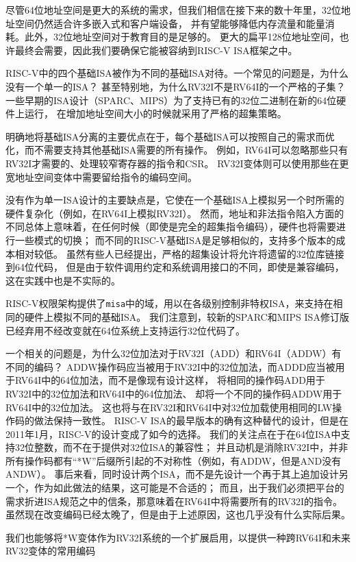 \begin{commentary}

尽管64位地址空间是更大的系统的需求，但我们相信在接下来的数十年里，32位地址空间仍然适合许多嵌入式和客户端设备，
并有望能够降低内存流量和能量消耗。此外，32位地址空间对于教育目的是足够的。
更大的扁平128位地址空间，也许最终会需要，因此我们要确保它能被容纳到RISC-V ISA框架之中。
\end{commentary}

\begin{commentary}

RISC-V中的四个基础ISA被作为不同的基础ISA对待。一个常见的问题是，为什么没有一个单一的ISA？
甚至特别地，为什么RV32I不是RV64I的一个严格的子集？
一些早期的ISA设计（SPARC、MIPS）为了支持已有的32位二进制在新的64位硬件上运行，
在增加地址空间大小的时候就采用了严格的超集策略。

明确地将基础ISA分离的主要优点在于，每个基础ISA可以按照自己的需求而优化，而不需要支持其他基础ISA需要的所有操作。
例如，RV64I可以忽略那些只有RV32I才需要的、处理较窄寄存器的指令和CSR。
RV32I变体则可以使用那些在更宽地址空间变体中需要留给指令的编码空间。

没有作为单一ISA设计的主要缺点是，它使在一个基础ISA上模拟另一个时所需的硬件复杂化（例如，在RV64I上模拟RV32I）。
然而，地址和非法指令陷入方面的不同总体上意味着，在任何时候（即使是完全的超集指令编码），硬件也将需要进行一些模式的切换；
而不同的RISC-V基础ISA是足够相似的，支持多个版本的成本相对较低。
虽然有些人已经提出，严格的超集设计将允许将遗留的32位库链接到64位代码，
但是由于软件调用约定和系统调用接口的不同，即使是兼容编码，这在实践中也是不实际的。

RISC-V权限架构提供了{\tt misa}中的域，用以在各级别控制非特权ISA，来支持在相同的硬件上模拟不同的基础ISA。
我们注意到，较新的SPARC和MIPS ISA修订版已经弃用不经改变就在64位系统上支持运行32位代码了。

一个相关的问题是，为什么32位加法对于RV32I（ADD）和RV64I（ADDW）有不同的编码？
ADDW操作码应当被用于RV32I中的32位加法，而ADDD应当被用于RV64I中的64位加法，而不是像现有设计这样，
将相同的操作码ADD用于RV32I中的32位加法和RV64I中的64位加法、
却将一个不同的操作码ADDW用于RV64I中的32位加法。
这也将与在RV32I和RV64I中对32位加载使用相同的LW操作码的做法保持一致性。
RISC-V ISA的最早版本的确有这种替代的设计，但是在2011年1月，RISC-V的设计变成了如今的选择。
我们的关注点在于在64位ISA中支持32位整数，而不在于提供对32位ISA的兼容性；
并且动机是消除RV32I中，并非所有操作码都有“*W”后缀所引起的不对称性（例如，有ADDW，但是AND没有ANDW）。
事后来看，同时设计两个ISA，而不是先设计一个再于其上追加设计另一个，作为如此做法的结果，这可能是不合适的；
而且，出于我们必须把平台的需求折进ISA规范之中的信条，那意味着在RV64I中将需要所有的RV32I的指令。
虽然现在改变编码已经太晚了，但是由于上述原因，这也几乎没有什么实际后果。

我们也能够将*W变体作为RV32I系统的一个扩展启用，以提供一种跨RV64I和未来RV32变体的常用编码
\end{commentary}

